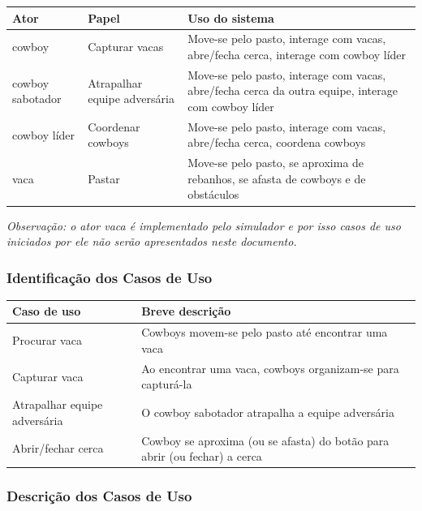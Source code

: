 \documentclass{llncs}
\begin{document}
\begin{center}
\begin{tabular}{|l|p{3cm}|p{8cm}|}
\hline
\rowcolor[gray]{0.8} \textbf{Ator}	&\textbf{Papel}	&\textbf{Uso do sistema} \\
\hline
cowboy	&Capturar vacas		&Move-se pelo pasto, interage com vacas, abre/fecha cerca, interage com cowboy líder \\ 
\hline
cowboy sabotador	&Atrapalhar equipe adversária	&Move-se pelo pasto, interage com vacas, abre/fecha cerca da outra equipe, interage com cowboy líder \\
\hline
cowboy líder	&Coordenar cowboys	&Move-se pelo pasto, interage com vacas, abre/fecha cerca, coordena cowboys \\
\hline
vaca	&Pastar	&Move-se pelo pasto, se aproxima de rebanhos, se afasta de cowboys e de obstáculos \\
\hline
\end{tabular}
\end{center}

\textit{Observação: o ator vaca é implementado pelo simulador e por isso casos de uso iniciados por ele não serão apresentados neste documento.}


\subsubsection{Identificação dos Casos de Uso}

\begin{center}
\begin{tabular}{|p{3cm}|p{10cm}|}
\hline
\rowcolor[gray]{0.8} \textbf{Caso de uso}		&\textbf{Breve descrição} \\
\hline
Procurar vaca	&Cowboys movem-se pelo pasto até encontrar uma vaca \\
\hline
Capturar vaca	&Ao encontrar uma vaca, cowboys organizam-se para capturá-la \\
\hline
Atrapalhar equipe adversária &O cowboy sabotador atrapalha a equipe adversária \\
\hline
Abrir/fechar cerca	&Cowboy se aproxima (ou se afasta) do botão para abrir (ou fechar) a cerca  \\
\hline
\end{tabular}
\end{center}


\subsubsection{Descrição dos Casos de Uso}
\end{document}
